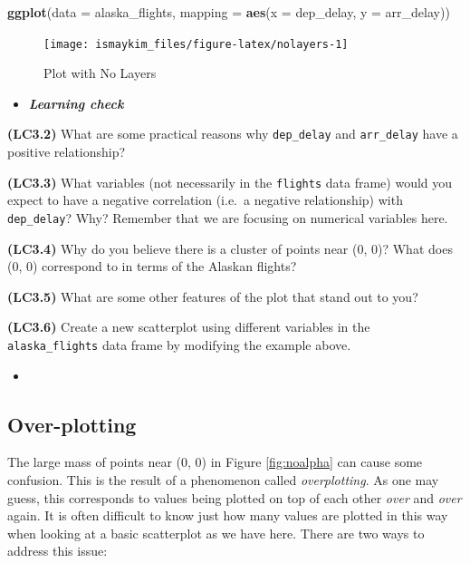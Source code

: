 \documentclass[12pt,]{krantz}
\makeatletter
\newenvironment{Shaded}{\begin{snugshade}}{\end{snugshade}}
\newcommand{\KeywordTok}[1]{\textcolor[rgb]{0.27,0.27,0.27}{\textbf{#1}}}
\newcommand{\DataTypeTok}[1]{\textcolor[rgb]{0.27,0.27,0.27}{#1}}
\newcommand{\NormalTok}[1]{#1}
\newenvironment{kframe}{%
\medskip{}
\setlength{\fboxsep}{.8em}
 \def\at@end@of@kframe{}%
 \ifinner\ifhmode%
  \def\at@end@of@kframe{\end{minipage}}%
  \begin{minipage}{\columnwidth}%
 \fi\fi%
 \def\FrameCommand##1{\hskip\@totalleftmargin \hskip-\fboxsep
 \colorbox{shadecolor}{##1}\hskip-\fboxsep
     \hskip-\linewidth \hskip-\@totalleftmargin \hskip\columnwidth}%
 \MakeFramed {\advance\hsize-\width
   \@totalleftmargin\z@ \linewidth\hsize
   \@setminipage}}%
 {\par\unskip\endMakeFramed%
 \at@end@of@kframe}
\renewenvironment{Shaded}{\begin{kframe}}{\end{kframe}}
\newenvironment{rmdblock}[1]
  {\begin{shaded*}
  \begin{itemize}
  \renewcommand{\labelitemi}{
    \raisebox{-.7\height}[0pt][0pt]{
    }
  }
  \item
  }
  {
  \end{itemize}
  \end{shaded*}
  }
\newenvironment{learncheck}
  {\begin{rmdblock}{warning}}
  {\end{rmdblock}}
\makeatother
\begin{document}
\begin{Shaded}
\begin{Highlighting}[]
\KeywordTok{ggplot}\NormalTok{(}\DataTypeTok{data =}\NormalTok{ alaska_flights, }
       \DataTypeTok{mapping =} \KeywordTok{aes}\NormalTok{(}\DataTypeTok{x =}\NormalTok{ dep_delay, }\DataTypeTok{y =}\NormalTok{ arr_delay))}
\end{Highlighting}
\end{Shaded}

\begin{figure}

{\centering \texttt{[image: ismaykim\_files/figure-latex/nolayers-1]} 

}

\caption{Plot with No Layers}\label{fig:nolayers}
\end{figure}

\begin{learncheck}
\textbf{\emph{Learning check}}
\end{learncheck}

\textbf{(LC3.2)} What are some practical reasons why \texttt{dep\_delay}
and \texttt{arr\_delay} have a positive relationship?

\textbf{(LC3.3)} What variables (not necessarily in the \texttt{flights}
data frame) would you expect to have a negative correlation (i.e.~a
negative relationship) with \texttt{dep\_delay}? Why? Remember that we
are focusing on numerical variables here.

\textbf{(LC3.4)} Why do you believe there is a cluster of points near
(0, 0)? What does (0, 0) correspond to in terms of the Alaskan flights?

\textbf{(LC3.5)} What are some other features of the plot that stand out
to you?

\textbf{(LC3.6)} Create a new scatterplot using different variables in
the \texttt{alaska\_flights} data frame by modifying the example above.

\begin{learncheck}

\end{learncheck}

\subsection{Over-plotting}\label{overplotting}

The large mass of points near (0, 0) in Figure \ref{fig:noalpha} can
cause some confusion. This is the result of a phenomenon called
\emph{overplotting}. As one may guess, this corresponds to values being
plotted on top of each other \emph{over} and \emph{over} again. It is
often difficult to know just how many values are plotted in this way
when looking at a basic scatterplot as we have here. There are two ways
to address this issue:
\end{document}
